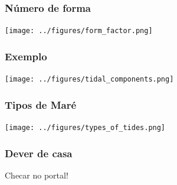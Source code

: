 \begin{frame}
  \frametitle{Número de forma}
  \begin{center}
    \texttt{[image: ../figures/form\_factor.png]}
  \end{center}
\end{frame}


\begin{frame}
  \frametitle{Exemplo}
  \begin{center}
    \texttt{[image: ../figures/tidal\_components.png]}
  \end{center}
\end{frame}


\begin{frame}
  \frametitle{Tipos de Maré}
  \begin{center}
    \texttt{[image: ../figures/types\_of\_tides.png]}
  \end{center}
\end{frame}


\begin{frame}
\frametitle{Dever de casa}
    Checar no portal!
\end{frame}


